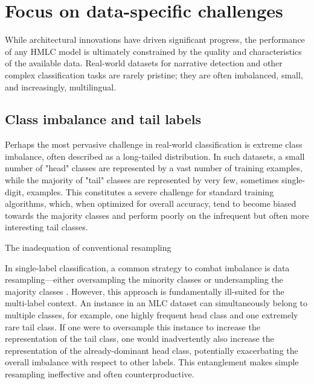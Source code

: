 \section{Focus on data-specific challenges}
While architectural innovations have driven significant progress, the performance of any HMLC model is ultimately constrained by the quality and characteristics of the available data. Real-world datasets for narrative detection and other complex classification tasks are rarely pristine; they are often imbalanced, small, and increasingly, multilingual.

\subsection{Class imbalance and tail labels}
Perhaps the most pervasive challenge in real-world classification is extreme class imbalance, often described as a long-tailed distribution. In such datasets, a small number of "head" classes are represented by a vast number of training examples, while the majority of "tail" classes are represented by very few, sometimes single-digit, examples. \cite{huang-etal-2021-balancing} This constitutes a severe challenge for standard training algorithms, which, when optimized for overall accuracy, tend to become biased towards the majority classes and perform poorly on the infrequent but often more interesting tail classes.

The inadequation of conventional resampling

In single-label classification, a common strategy to combat imbalance is data resampling—either oversampling the minority classes or undersampling the majority classes \cite{Luque2019The,Thabtah2020Data}. However, this approach is fundamentally ill-suited for the multi-label context. An instance in an MLC dataset can simultaneously belong to multiple classes, for example, one highly frequent head class and one extremely rare tail class. If one were to oversample this instance to increase the representation of the tail class, one would inadvertently also increase the representation of the already-dominant head class, potentially exacerbating the overall imbalance with respect to other labels. This entanglement makes simple resampling ineffective and often counterproductive. \cite{yuan2024research}